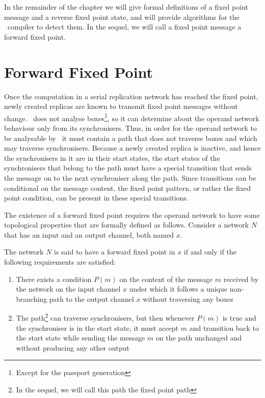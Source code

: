 In the remainder of the chapter we will give formal definitions of a fixed point message and a reverse fixed point state, and will provide algorithms for the \ak\ compiler to detect them. In the sequel, we will call a fixed point message a forward fixed point.


    \section{Forward Fixed Point}
Once the computation in a serial replication network has reached the fixed point, newly created replicas are known to transmit fixed point messages without change. \ak\ does not analyse boxes\footnote{Except for the  passport generation}, so it can determine about the operand network behaviour only from its synchronisers. Thus, in order for the operand network to be analysable by \ak\, it must contain a path that does not traverse boxes and which may traverse synchronisers. Because a newly created replica is inactive, and hence the synchronisers in it are in their start states, the start states of the synchronisers that belong to the path must have a special transition that sends the message on to the next synchroniser along the path. Since transitions can be conditional on the message content, the fixed point pattern, or rather the fixed point condition, can be present in these special transitions.

The existence of a forward fixed point requires the operand network to have some topological properties that are formally defined as follows. Consider a network $N$ that has an input and an output channel, both named $x$.

\begin{definition}\label{ffp_def}The network $N$ is said to have a forward fixed point in $x$ if and only if the following requirements are satisfied:
\begin{enumerate}
\item There exists a condition $P(m)$ on the content of the message $m$ received by the network on the input channel $x$ under which it follows a unique non-branching path to the output channel $x$ without traversing any boxes
\item The path\footnote{In the sequel, we will call this path the fixed point path} can traverse synchronisers, but then whenever $P(m)$ is true and the synchroniser is in the start state, it must accept $m$ and transition back to the start state while sending the message $m$ on the path unchanged and without producing any other output
\end{enumerate}
\end{definition}

